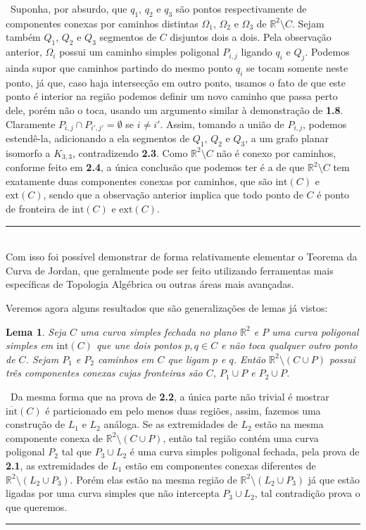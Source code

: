 \documentclass[12pt,a4paper]{article}
\newtheorem{lem}[mydef]{Lema}
\def\dem{\par\smallbreak\noindent {\textit{ Demonstração:}} \ }
\def\eop{\hfill\rule{2.5mm}{2.5mm} \\ }
\theoremstyle{definition}
\begin{document}
\dem Suponha, por absurdo, que $q_1$, $q_2$ e $q_3$ são pontos respectivamente de componentes conexas por caminhos distintas  $\Omega_1$, $\Omega_2$ e $\Omega_3$ de $\mathbb{R}^2\setminus C$. Sejam também $Q_1$, $Q_2$ e $Q_3$ segmentos de $C$ disjuntos dois a dois. Pela observação anterior, $\Omega_i$ possui um caminho simples poligonal $P_{i,j}$ ligando $q_i$ e $Q_j$. Podemos ainda supor que caminhos partindo do mesmo ponto $q_i$ se tocam somente neste ponto, já que, caso haja intersecção em outro ponto, usamos o fato de que este ponto é interior na região podemos definir um novo caminho que passa perto dele, porém não o toca, usando um argumento similar à demonstração de \textbf{1.8}. Claramente $P_{i,j}\cap P_{i',j'}=\emptyset$ se $i\neq i'$. Assim, tomando a união de $P_{i,j}$, podemos estendê-la, adicionando a ela segmentos de $Q_1$, $Q_2$ e $Q_3$, a um grafo planar isomorfo a $K_{3,3}$, contradizendo \textbf{2.3}. Como $\mathbb{R}^2\setminus C$ não é conexo por caminhos, conforme feito em \textbf{2.4}, a única conclusão que podemos ter é a de que $\mathbb{R}^2\setminus C$ tem exatamente duas componentes conexas por caminhos, que são $\text{int}(C)$ e $\text{ext}(C)$, sendo que a observação anterior implica que todo ponto de $C$ é ponto de fronteira de $\text{int}(C)$ e $\text{ext}(C)$. \eop

Com isso foi possível demonstrar de forma relativamente elementar o Teorema da Curva de Jordan, que geralmente pode ser feito utilizando ferramentas mais específicas de Topologia Algébrica ou outras áreas mais avançadas. 

Veremos agora alguns resultados que são generalizações de lemas já vistos:

\begin{lem}
 
    Seja $C$ uma curva simples fechada no plano $\mathbb{R}^2$ e $P$ uma curva poligonal simples em $\text{int}(C)$ que une dois pontos $p,q\in C$ e não toca qualquer outro ponto de $C$. Sejam $P_1$ e $P_2$ caminhos em $C$ que ligam $p$ e $q$. Então $\mathbb{R}^2\setminus(C\cup P)$ possui três componentes conexas cujas fronteiras são $C$, $P_1\cup P$ e $P_2\cup P$.
    
\end{lem}

\dem Da mesma forma que na prova de \textbf{2.2}, a única parte não trivial é mostrar $\overline{\text{int}}(C)$ é particionado em pelo menos duas regiões, assim, fazemos uma construção de $L_1$ e $L_2$ análoga. Se as extremidades de $L_2$ estão na mesma componente conexa de $\mathbb{R}^2\setminus(C\cup P)$, então tal região contém uma curva poligonal $P_2$ tal que $P_3\cup L_2$ é uma curva simples poligonal fechada, pela prova de \textbf{2.1}, as extremidades de $L_1$ estão em componentes conexas diferentes de $\mathbb{R}^2\setminus(L_2\cup P_3)$. Porém elas estão na mesma região de $\mathbb{R}^2\setminus(L_2\cup P_3)$ já que estão ligadas por uma curva simples que não intercepta $P_3\cup L_2$, tal contradição prova o que queremos. \eop 
\end{document}
